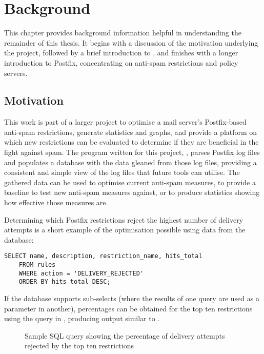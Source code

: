\chapter{Background}

\label{background}

This chapter provides background information helpful in understanding the
remainder of this thesis.  It begins with a discussion of the motivation
underlying the project, followed by a brief introduction to ,
and finishes with a longer introduction to Postfix, concentrating on
anti-spam restrictions and policy servers.

\section{Motivation}

\label{motivation}

This work is part of a larger project to optimise a mail server's
Postfix-based anti-spam restrictions, generate statistics and graphs, and
provide a platform on which new restrictions can be evaluated to determine
if they are beneficial in the fight against spam.  The program written for
this project, \parsername{}, parses Postfix log files and populates a
database with the data gleaned from those log files, providing a consistent
and simple view of the log files that future tools can utilise.  The
gathered data can be used to optimise current anti-spam measures, to
provide a baseline to test new anti-spam measures against, or to produce
statistics showing how effective those measures are.

Determining which Postfix restrictions reject the highest number of
delivery attempts is a short example of the optimisation possible using
data from the database:

\begin{verbatim}
SELECT name, description, restriction_name, hits_total
    FROM rules
    WHERE action = 'DELIVERY_REJECTED'
    ORDER BY hits_total DESC;
\end{verbatim}

If the database supports sub-selects (where the results of one query are
used as a parameter in another), percentages can be obtained for the top
ten restrictions using the query in , producing
output similar to .

\begin{figure}[thbp]
    \caption{Sample SQL query showing the percentage of delivery attempts
    rejected by the top ten restrictions}
    \empty{}\label{Sample SQL query}
    
\end{figure}

